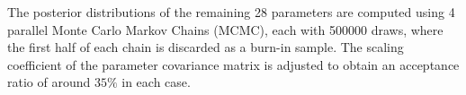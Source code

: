 \documentclass[12pt]{article}
\numberwithin{equation}{section}
\begin{document}
The posterior distributions of the remaining 28 parameters are computed using 4 parallel Monte Carlo Markov Chains (MCMC), each with 500000 draws, where the first half of each chain is discarded as a burn-in sample. The scaling coefficient of the parameter covariance matrix is adjusted to obtain an acceptance ratio of around $35 \%$ in each case. 
 

\end{document}

